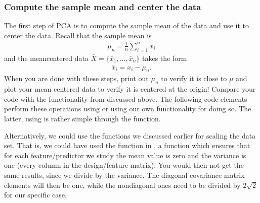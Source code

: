 \documentclass[letterpaper,10pt,english]{sphinxmanual}
\begin{document}
\subsubsection{Compute the sample mean and center the data}
\label{\detokenize{chapter8:compute-the-sample-mean-and-center-the-data}}
The first step of PCA is to compute the sample mean of the data and use it to center the data. Recall that the sample mean is
\begin{equation*}
\begin{split}
\mu_n = \frac{1}{n} \sum_{i=1}^n x_i
\end{split}
\end{equation*}
and the mean\sphinxhyphen{}centered data \(\bar{X} = \{ \bar{x}_1, \ldots, \bar{x}_n \}\) takes the form
\begin{equation*}
\begin{split}
\bar{x}_i = x_i - \mu_n.
\end{split}
\end{equation*}
When you are done with these steps, print out \(\mu_n\) to verify it is
close to \(\mu\) and plot your mean centered data to verify it is
centered at the origin! Compare your code with the functionality from  discussed above.
The following code elements perform these operations using  or using our own functionality for doing so. The latter, using  is rather simple through the  function.

\begin{sphinxVerbatim}[commandchars=\\\{\}]
  
   
    
\end{sphinxVerbatim}

Alternatively, we could use the functions we discussed
earlier for scaling the data set.  That is, we could have used the
 function in , a function which ensures
that for each feature/predictor we study the mean value is zero and
the variance is one (every column in the design/feature matrix).  You
would then not get the same results, since we divide by the
variance. The diagonal covariance matrix elements will then be one,
while the non\sphinxhyphen{}diagonal ones need to be divided by \(2\sqrt{2}\) for our
specific case.
\end{document}
